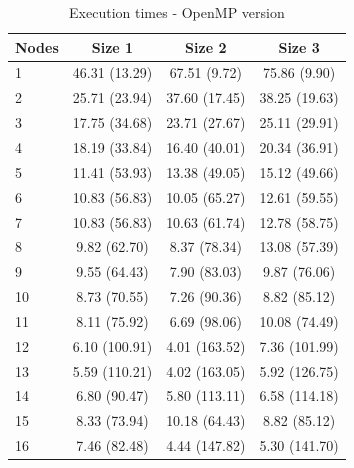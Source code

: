 \documentclass{article}
\begin{document}
\begin{table}[H]
\centering
\begin{tabular}{|l|c|c|c|}
\hline
Nodes & Size 1 & Size 2 & Size 3 \\ \hline
1 & 46.31 (13.29) & 67.51 (9.72) & 75.86 (9.90) \\ \hline
2 & 25.71 (23.94) & 37.60 (17.45) & 38.25 (19.63) \\ \hline
3 & 17.75 (34.68) & 23.71 (27.67) & 25.11 (29.91) \\ \hline
4 & 18.19 (33.84) & 16.40 (40.01) & 20.34 (36.91) \\ \hline
5 & 11.41 (53.93) & 13.38 (49.05) & 15.12 (49.66) \\ \hline
6 & 10.83 (56.83) & 10.05 (65.27) & 12.61 (59.55) \\ \hline
7 & 10.83 (56.83) & 10.63 (61.74) & 12.78 (58.75) \\ \hline
8 & 9.82 (62.70) & 8.37 (78.34) & 13.08 (57.39) \\ \hline
9 & 9.55 (64.43) & 7.90 (83.03) & 9.87 (76.06) \\ \hline
10 & 8.73 (70.55) & 7.26 (90.36) & 8.82 (85.12) \\ \hline
11 & 8.11 (75.92) & 6.69 (98.06) & 10.08 (74.49) \\ \hline
12 & 6.10 (100.91) & 4.01 (163.52) & 7.36 (101.99) \\ \hline
13 & 5.59 (110.21) & 4.02 (163.05) & 5.92 (126.75) \\ \hline
14 & 6.80 (90.47) & 5.80 (113.11) & 6.58 (114.18) \\ \hline
15 & 8.33 (73.94) & 10.18 (64.43) & 8.82 (85.12) \\ \hline
16 & 7.46 (82.48) & 4.44 (147.82) & 5.30 (141.70) \\ \hline
\end{tabular}
\caption{Execution times - OpenMP version} \label{tab:openmptimes}
\end{table}
\end{document}
